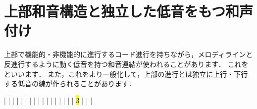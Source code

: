 \documentclass[dvipdfmx,uplatex,b5paper,openany,jbase=12Q,nomag*,textwidth-limit=44%
               ]{gachimuchi}[2020/05/05]
\begin{document}
\section{上部和音構造と独立した低音をもつ和声付け}
上部で機能的・非機能的に進行するコード進行を持ちながら，メロディラインと
反進行するように動く低音を持つ和音連結が使われることがあります．
これをといいます．
また，これをより一般化して，上部の進行とは独立に上行・下行する低音の線が作られることがあります．

\begin{Music}
  \nobarnumbers%
  \Startpiece%
  \NOtes
  \qp|%
  \en\bar
  \NOtes
  |%
  \en\bar
  \NOtes
  |%
  \en\bar
  \NOTEs
  |%
  \en\bar
  \NOTesp
  |%
  \en\NOtes
  |\Mryaku\sk
  \en\setdoublebar
  \endpiece
  \nobarnumbers%
  \Startpiece
  \NOtes
  \qp|%
  \en\bar
  \NOtes
  |%
  \en\bar
  \NOtes
  |%
  \en\bar\hardspace{\WNwidth}%
  \NOTes
  |%
  \hl{3}%
  \en\bar
  \NOTesp
  |%
  \en\NOtes
  |\Mryaku\sk
  \en\setdoublebar
  \endpiece%
\end{Music}
\end{document}
